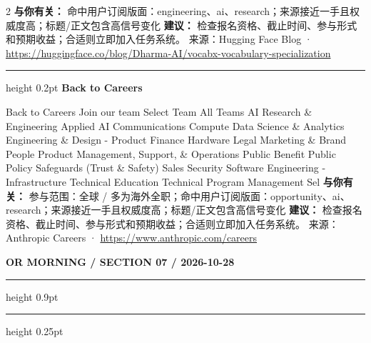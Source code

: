 \documentclass[10.5pt]{ctexart}
\begin{document}
\begin{multicols}{2}
\textbf{与你有关：} 命中用户订阅版面：engineering、ai、research；来源接近一手且权威度高；标题/正文包含高信号变化
\textbf{建议：} 检查报名资格、截止时间、参与形式和预期收益；合适则立即加入任务系统。
{\footnotesize\color{ormuted} 来源：Hugging Face Blog · \url{https://huggingface.co/blog/Dharma-AI/vocabx-vocabulary-specialization}}
\vspace{2mm}
\hrule height 0.2pt
\vspace{2mm}
{\large\bfseries Back to Careers}\par
Back to Careers Join our team Select Team All Teams AI Research \& Engineering Applied AI Communications Compute Data Science \& Analytics Engineering \& Design - Product Finance Hardware Legal Marketing \& Brand People Product Management, Support, \& Operations Public Benefit Public Policy Safeguards (Trust \& Safety) Sales Security Software Engineering - Infrastructure Technical Education Technical Program Management Sel
\textbf{与你有关：} 参与范围：全球 / 多为海外全职；命中用户订阅版面：opportunity、ai、research；来源接近一手且权威度高；标题/正文包含高信号变化
\textbf{建议：} 检查报名资格、截止时间、参与形式和预期收益；合适则立即加入任务系统。
{\footnotesize\color{ormuted} 来源：Anthropic Careers · \url{https://www.anthropic.com/careers}}
\end{multicols}
\newpage
{\small\bfseries OR MORNING / SECTION 07 / 2026-10-28}
\vspace{2mm}
\hrule height 0.9pt
\vspace{1.5mm}
\hrule height 0.25pt
\vspace{4mm}
\end{document}
